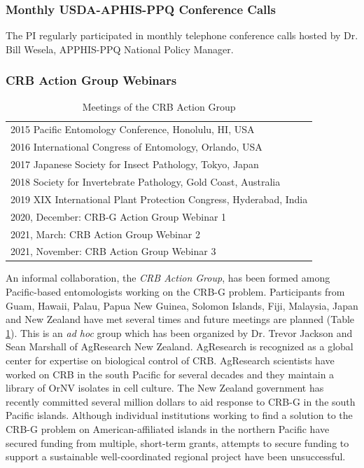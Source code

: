 \documentclass[12pt,letterpaper,english,bibliography=totocnumbered,abstract=on]{scrartcl}
\begin{document}
\subsubsection{Monthly USDA-APHIS-PPQ Conference Calls}

The PI regularly participated in monthly telephone conference calls hosted by Dr. Bill Wesela, APPHIS-PPQ National Policy Manager.

\subsubsection{CRB Action Group Webinars}

\begin{table}[h]
\centering
\caption{Meetings of the CRB Action Group}
\begin{tabular}{l}
	\toprule
	2015 Pacific Entomology Conference, Honolulu, HI, USA \\
	2016 International Congress of Entomology, Orlando, USA \\
	2017 Japanese Society for Insect Pathology, Tokyo, Japan \\
	2018 Society for Invertebrate Pathology, Gold Coast, Australia \\
	2019 XIX International Plant Protection Congress, Hyderabad, India \\
	2020, December: CRB-G Action Group Webinar 1 \cite{mooreVideoRecordingCRBG2020}\\
	2021, March: CRB Action Group Webinar 2 \cite{mooreVideoRecordingCRBG2021}\\
	2021, November: CRB Action Group Webinar 3 \cite{mooreVideoRecordingCRBG2021a} \\
	\bottomrule
\end{tabular}
\label{tab:action-group}
\end{table}	


An informal collaboration, the \textit{CRB Action Group}, has been formed among Pacific-based entomologists working on the CRB-G problem. Participants from Guam, Hawaii, Palau, Papua New Guinea, Solomon Islands, Fiji, Malaysia, Japan and New Zealand have met several times and future meetings are planned (Table \ref{tab:action-group}).  This is an \textit{ad hoc} group which has been organized by Dr. Trevor Jackson and Sean Marshall of AgResearch New Zealand. AgResearch is recognized as a global center for expertise on biological control of CRB. AgResearch scientists have worked on CRB in the south Pacific for several decades and they maintain a library of OrNV isolates in cell culture. The New Zealand government has recently committed several million dollars to aid response to CRB-G in the south Pacific islands. Although individual institutions working to find a solution to the CRB-G problem on American-affiliated islands in the northern Pacific have secured funding from multiple, short-term grants, attempts to secure funding to support a sustainable well-coordinated regional project have been unsuccessful. 
\end{document}

